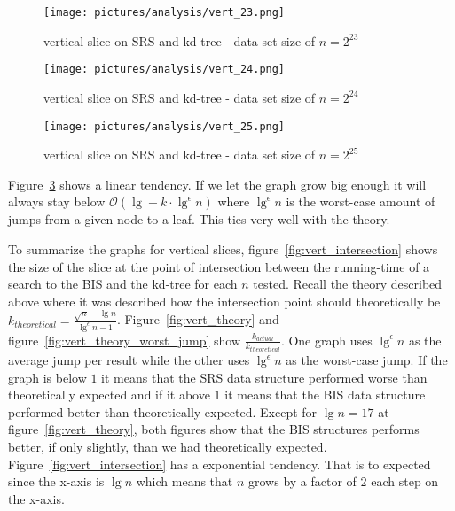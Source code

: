\begin{figure}[h]
    \centering
    \texttt{[image: pictures/analysis/vert\_23.png]}
    \caption{vertical slice on SRS and kd-tree - data set size of $n=2^{23}$}\label{fig:vert_23}
\end{figure}

\begin{figure}[h]
    \centering
    \texttt{[image: pictures/analysis/vert\_24.png]}
    \caption{vertical slice on SRS and kd-tree - data set size of $n=2^{24}$}\label{fig:vert_24}
\end{figure}

\begin{figure}[h]
    \centering
    \texttt{[image: pictures/analysis/vert\_25.png]}
    \caption{vertical slice on SRS and kd-tree - data set size of $n=2^{25}$}\label{fig:vert_25}
\end{figure}

\clearpage
Figure~\ref{fig:vert_25} shows a linear tendency. If we let the graph grow big enough it will always stay below $\mathcal{O}(\lg + k\cdot\lg^\epsilon n)$ where $\lg^\epsilon n$ is the worst-case amount of jumps from a given node to a leaf. This ties very well with the theory.



To summarize the graphs for vertical slices, figure~\ref{fig:vert_intersection} shows the size of the slice at the point of intersection between the running-time of a search to the BIS and the kd-tree for each $n$ tested. Recall the theory described above where it was described how the intersection point should theoretically be $k_{theoretical} = \frac{\sqrt{n} - \lg n}{\lg^\epsilon n - 1}$. Figure~\ref{fig:vert_theory} and figure~\ref{fig:vert_theory_worst_jump} show $\frac{k_{actual}}{k_{theoretical}}$. One graph uses $\lg^\epsilon n$ as the average jump per result while the other uses $\lg^\epsilon n$ as the worst-case jump. If the graph is below $1$ it means that the SRS data structure performed worse than theoretically expected and if it above $1$ it means that the BIS data structure performed better than theoretically expected. Except for $\lg n = 17$ at figure~\ref{fig:vert_theory}, both figures show that the BIS structures performs better, if only slightly, than we had theoretically expected. Figure~\ref{fig:vert_intersection} has a exponential tendency. That is to expected since the x-axis is $\lg n$ which means that $n$ grows by a factor of $2$ each step on the x-axis.

